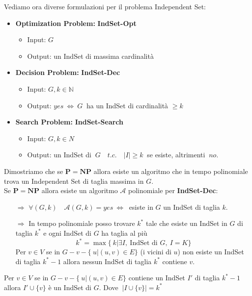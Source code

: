 \documentclass[a4paper]{article}
\theoremstyle{definition}
\newcommand{\N}{\mathbb{N}}
\newcommand{\p}{\mathbf{P}}
\newcommand{\np}{\mathbf{NP}}
\newcommand{\alg}[1]{\mathcal{#1}}
\begin{document}
		Vediamo ora diverse formulazioni per il problema Independent Set: 
		\begin{itemize}
			\item \textbf{Optimization Problem:} \textbf{IndSet-Opt}
			\begin{itemize}
				\item Input: $ G $
				\item Output: un IndSet di massima cardinalità
			\end{itemize}
			\item \textbf{Decision Problem:} \textbf{IndSet-Dec}
			\begin{itemize}
				\item Input: $ G, k\in \N $
				\item Output: $ yes\ \Leftrightarrow\ G\ $ ha un IndSet di cardinalità $ \geq k $
			\end{itemize}
			\item \textbf{Search Problem:} \textbf{IndSet-Search}
			\begin{itemize}
				\item Input: $ G, k\in N $
				\item Output: un IndSet di $ \ G\quad t.c.\quad \big| I \big|\geq k \ $ se esiste, altrimenti $\ no $.
			\end{itemize}
		\end{itemize}
		
		Dimostriamo che se $ \p = \np $ allora esiste un algoritmo che in tempo polinomiale trova un Independent Set di taglia massima in $ G $.\\
		Se $ \p = \np $ allora esiste un algoritmo $ \alg{A} $ polinomiale per \textbf{IndSet-Dec}:
		\begin{itemize}
			\item[$\Rightarrow$] $ \forall (G, k)\quad \alg{A}(G, k) = yes\ \Leftrightarrow\ $ esiste in $ G $ un IndSet di taglia $ k $.
			\item[$\Rightarrow$] In tempo polinomiale posso trovare $ k^* $ tale che esiste un IndSet in $ G $ di taglia $ k^* $ e ogni IndSet di $ G $ ha taglia al più 
			\[
				k^* = \max\{\ k\big| \exists I,\ \text{IndSet di } G,\ I = K \} 
			\]
			Per $ v\in V $ se in $ G - v - \{\ u\big| (u,v) \in E \} $ (i vicini di $ u $) non esiste un IndSet di taglia $ k^* - 1 $ allora nessun IndSet di taglia $ k^* $ contiene $ v $.
		\end{itemize}
		
		Per $ v\in V $ se in $ G - v - \{\ u\big| (u,v) \in E \} $ contiene un IndSet $ I' $ di taglia $ k^* - 1 $ allora $ I' \cup \{v \} $ è un IndSet di $ G $. Dove $ \ \big|I\cup\{v\}\big| = k^* $
		
\end{document}

